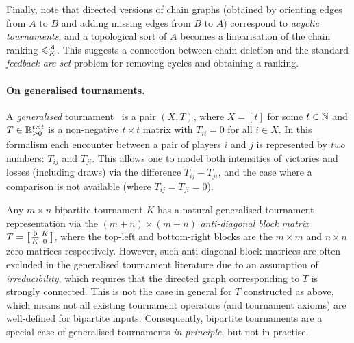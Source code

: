 
Finally, note that directed versions of chain graphs (obtained by orienting
edges from $A$ to $B$ and adding missing edges from $B$ to $A$) correspond to
\emph{acyclic tournaments}, and a topological sort of $A$ becomes a
linearisation of the chain ranking $\leqslant^{\mathcal{A}}_K$. This suggests a connection
between chain deletion and the standard \emph{feedback arc set} problem for
removing cycles and obtaining a ranking.

\paragraph{On generalised tournaments.}
%
A \emph{generalised} tournament~\cite{gonzalez2014paired} is a pair $(X, T)$,
where $X = [t]$ for some $t \in \mathbb{N}$ and $T \in \mathbb{R}_{\ge 0}^{t \times t}$ is a
non-negative $t \times t$ matrix with $T_{ii} = 0$ for all $i \in X$. In this
formalism each encounter between a pair of players $i$ and $j$ is represented
by \emph{two} numbers: $T_{ij}$ and $T_{ji}$. This allows one to model both
intensities of victories and losses (including draws) via the difference
$T_{ij} - T_{ji}$, and the case where a comparison is not available (where
$T_{ij} = T_{ji} = 0$).

Any $m \times n$ bipartite tournament $K$ has a natural generalised tournament
representation via the $(m + n) \times (m + n)$ \emph{anti-diagonal block
matrix}
$
    T = \left[\begin{smallmatrix}
        0 & K \\
        {\overline{K}} & 0
    \end{smallmatrix}\right]
$, where the top-left and bottom-right blocks are the $m \times m$ and $n
\times n$ zero matrices respectively.  However, such anti-diagonal block
matrices are often excluded in the generalised tournament literature due to an
assumption of \emph{irreducibility}, which requires that the directed graph
corresponding to $T$ is strongly connected. This is not the case in general for
$T$ constructed as above, which means not all existing tournament
operators (and tournament axioms) are well-defined for bipartite
inputs.\footnotemark{} Consequently, bipartite tournaments are a special case
of generalised tournaments \emph{in principle}, but not in practise.


